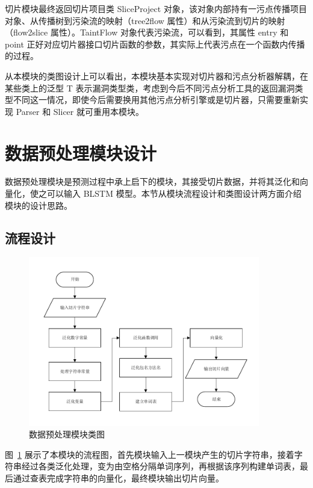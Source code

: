 切片模块最终返回切片项目类 SliceProject 对象，该对象内部持有一污点传播项目对象、从传播树到污染流的映射（tree2flow 属性）和从污染流到切片的映射（flow2slice 属性）。TaintFlow 对象代表污染流，可以看到，其属性 entry 和 point 正好对应切片器接口切片函数的参数，其实际上代表污点在一个函数内传播的过程。

从本模块的类图设计上可以看出，本模块基本实现对切片器和污点分析器解耦，在某些类上的泛型 T 表示漏洞类型类，考虑到今后不同污点分析工具的返回漏洞类型不同这一情况，即使今后需要换用其他污点分析引擎或是切片器，只需要重新实现 Parser 和 Slicer 就可重用本模块。

\section{数据预处理模块设计}

数据预处理模块是预测过程中承上启下的模块，其接受切片数据，并将其泛化和向量化，使之可以输入 BLSTM 模型。本节从模块流程设计和类图设计两方面介绍模块的设计思路。

\subsection{流程设计}

\begin{figure}[!htb]
    \centering
    \includegraphics[width=0.9\textwidth]{FIGs/chapter3/preProcessing.pdf}
    \caption{数据预处理模块类图}\label{preProcessing}
\end{figure}

图~\ref{preProcessing} 展示了本模块的流程图，首先模块输入上一模块产生的切片字符串，接着字符串经过各类泛化处理，变为由空格分隔单词序列，再根据该序列构建单词表，最后通过查表完成字符串的向量化，最终模块输出切片向量。

